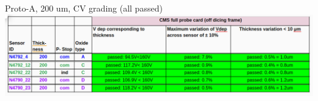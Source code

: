 \documentclass{beamer}
\begin{document}
\begin{frame}{Proto-A, 200 um, CV grading (all passed)}
  \includegraphics[width=.7\textwidth]{plots/CV_grading_200um.png}
\end{frame}
%
%
%
%
%
\end{document}
